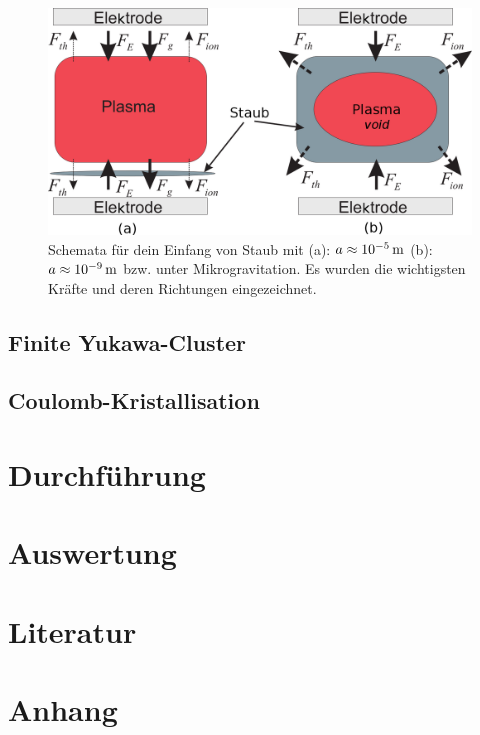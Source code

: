\documentclass[numbers=noenddot,a4paper]{scrartcl}
\newcommand{\tenpo}[1]{ 10^{#1}}
\begin{document}
					\begin{figure}[H]
						\centering
						\includegraphics[width=\textwidth,height=0.5\textwidth]{figs/directionsofforcesandtrappingmelzer.png}
						\caption{Schemata für dein Einfang von Staub mit (a): $a\approx\unit[\tenpo{-5}]{m}$ (b): $a\approx\unit[\tenpo{-9}]{m}$ bzw. unter Mikrogravitation. Es wurden die wichtigsten Kräfte und deren Richtungen eingezeichnet.}
						\label{img:kräfterichtungen}
					\end{figure}
					
				
		\subsection{Finite Yukawa-Cluster}\label{subsec:yukawaclust}
		
			
					
		\subsection{Coulomb-Kristallisation}\label{subsec:coulombkristall}			
					
	\newpage
	
	\section{Durchführung}\label{sec:durch}
	
	\newpage
	
	\section{Auswertung}\label{sec:auswert}
	
	\newpage
	
	\section{Literatur}\label{sec:lit}
	
		
		
	
	\newpage
	
	\section{Anhang}\label{sec:anhang}
	
%		
%				
	
\end{document}
